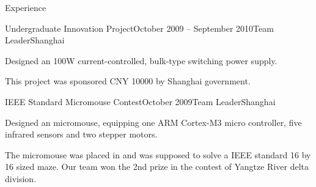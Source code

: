 \documentclass{resume} %
\begin{document}
\begin{rSection}{Experience}
\begin{rSubsection}{Undergraduate Innovation Project}{October 2009 -- September 2010}{Team Leader}{Shanghai}
    \item Designed an 100W current-controlled, bulk-type switching power
        supply.

    \item This project was sponsored CNY 10000 by Shanghai government.

    \end{rSubsection}

    \begin{rSubsection}{IEEE Standard Micromouse Contest}{October 2009}{Team Leader}{Shanghai}

    \item Designed an micromouse, equipping one ARM Cortex-M3 micro controller,
        five infrared sensors and two stepper motors.

    \item The micromouse was placed in and was supposed to solve a IEEE
        standard 16 by 16 sized maze.  Our team won the 2nd prize in the
        contest of Yangtze River delta division.

    \end{rSubsection}

\end{rSection}

\end{document}
